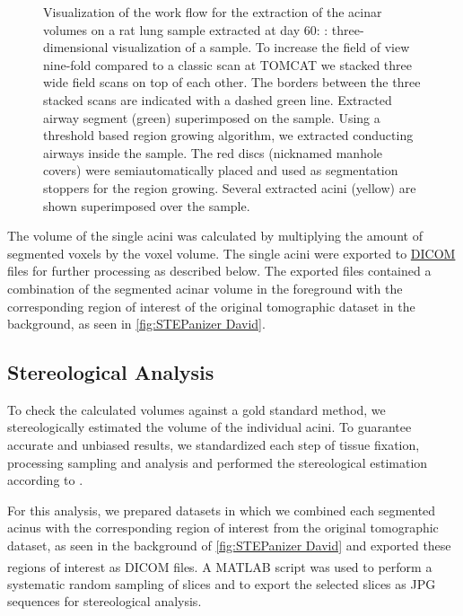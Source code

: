 \documentclass[a4paper,DIVcalc,abstract,english]{scrartcl}
\newlength\imagescale		%
\begin{document}
\begin{figure}[htb]
{\begin{tikzpicture}[x=\imagescale,y=-\imagescale]
		\end{tikzpicture}%
		\label{subfig:extracted acini}%
		}
	\caption{%
		Visualization of the work flow for the extraction of the acinar volumes on a rat lung sample extracted at day 60: %
		\protect{}: three-dimensional visualization of a sample.
		To increase the field of view nine-fold compared to a classic scan at TOMCAT we stacked three wide field scans on top of each other.
		The borders between the three stacked scans are indicated with a dashed green line. 
		\protect{} Extracted airway segment (green) superimposed on the sample.
		Using a threshold based region growing algorithm, we extracted conducting airways inside the sample.
		The red discs (nicknamed manhole covers) were semiautomatically placed and used as segmentation stoppers for the region growing.
		\protect{} Several extracted acini (yellow) are shown superimposed over the sample.
	}
	\label{fig:workflow}
\end{figure}

The volume of the single acini was calculated by multiplying the amount of segmented voxels by the voxel volume.
The single acini were exported to \href{https://secure.wikimedia.org/wikipedia/en/w/index.php?title=Digital_Imaging_and_Communications_in_Medicine&oldid=415023605}{DICOM} files for further processing as described below.
The exported files contained a combination of the segmented acinar volume in the foreground with the corresponding region of interest of the original tomographic dataset in the background, as seen in \autoref{fig:STEPanizer David}.

\subsection{Stereological Analysis}
To check the calculated volumes against a gold standard method, we stereologically estimated the volume of the individual acini.
To guarantee accurate and unbiased results, we standardized each step of tissue fixation, processing sampling and analysis and performed the stereological estimation according to \citet{Hsia2010}.

For this analysis, we prepared datasets in which we combined each segmented acinus with the corresponding region of interest from the original tomographic dataset, as seen in the background of \autoref{fig:STEPanizer David} and exported these regions of interest as DICOM files.
A MATLAB\textsuperscript{\textregistered} script was used to perform a systematic random sampling of slices and to export the selected slices as JPG sequences for stereological analysis.
\end{document}
